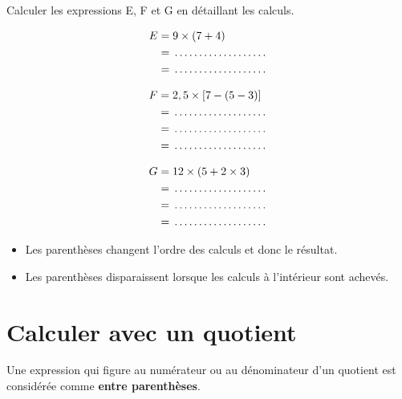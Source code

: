 \begin{examplebox}
Calculer les expressions E, F et G en détaillant les calculs.

\begin{minipage}[t]{0.32\textwidth}
\begin{align*}
E &= 9 \times (7 + 4) \\
&= \trous{3cm} \\
&= \trous{3cm}
\end{align*}
\end{minipage}
\hfill
\begin{minipage}[t]{0.32\textwidth}
\begin{align*}
F &= 2,5 \times [7 - (5 - 3)] \\
&= \trous{3cm}\\
&= \trous{3cm}\\
&= \trous{3cm}
\end{align*}
\end{minipage}
\hfill
\begin{minipage}[t]{0.32\textwidth}
\begin{align*}
G &= 12 \times (5 + 2 \times 3) \\
&= \trous{3cm} \\
&= \trous{3cm} \\
&= \trous{3cm}
\end{align*}
\end{minipage}
\end{examplebox}

\begin{remarkbox}
\begin{itemize}[label = \textbullet]
\item Les parenthèses changent l'ordre des calculs et donc le résultat.
\item Les parenthèses disparaissent lorsque les calculs à l'intérieur sont achevés.
\end{itemize}
\end{remarkbox}

\section{Calculer avec un quotient}

\begin{proprietebox}
Une expression qui figure au numérateur ou au dénominateur d'un quotient est considérée comme \textbf{entre parenthèses}.
\end{proprietebox}

